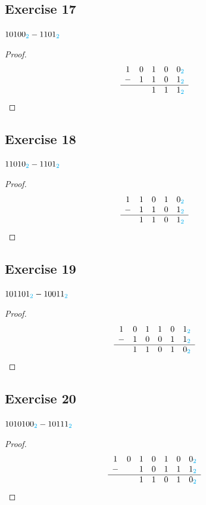 \documentclass[14pt]{extarticle}
\newcommand{\base}[1]{{\color{cyan}#1}} \newcommand{\da}{\downarrow}
\begin{document}
\subsection{Exercise 17} $10100_\base{2} - 1101_\base{2}$
\begin{proof} $$ \begin{array}{ccccc} 1&0&1&0&0_\base{2}\\ -&1&1&0&1_\base{2}\\
\hline & &1&1&1_\base{2}\\ \end{array} $$ \end{proof}

\subsection{Exercise 18} $11010_\base{2} - 1101_\base{2}$
\begin{proof} $$ \begin{array}{ccccc} 1&1&0&1&0_\base{2}\\ -&1&1&0&1_\base{2}\\
\hline &1&1&0&1_\base{2}\\ \end{array} $$ \end{proof}

\subsection{Exercise 19} $101101_\base{2} - 10011_\base{2}$
\begin{proof} $$ \begin{array}{cccccc} 1&0&1&1&0&1_\base{2}\\
-&1&0&0&1&1_\base{2}\\ \hline &1&1&0&1&0_\base{2}\\ \end{array} $$ \end{proof}

\subsection{Exercise 20} $1010100_\base{2} - 10111_\base{2}$
\begin{proof} $$ \begin{array}{ccccccc} 1&0&1&0&1&0&0_\base{2}\\ -&
&1&0&1&1&1_\base{2}\\ \hline & &1&1&0&1&0_\base{2}\\ \end{array} $$ \end{proof}
\end{document}

